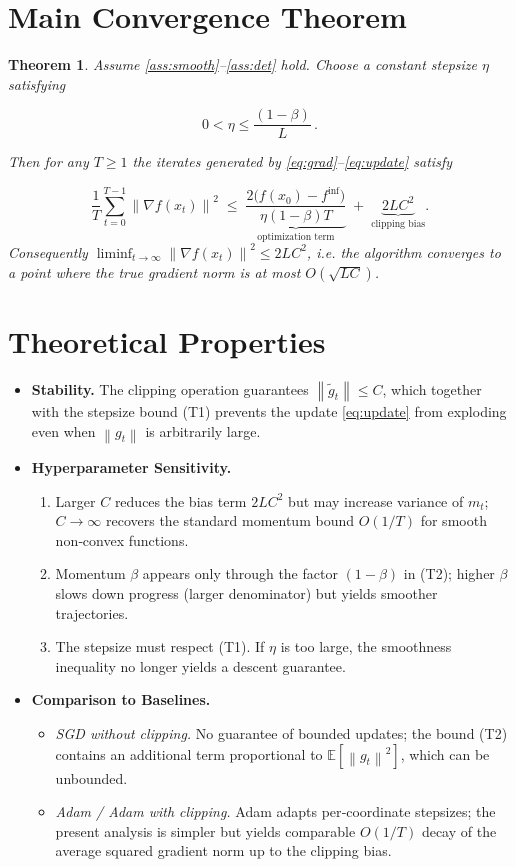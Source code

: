 \documentclass{article}
\newtheorem{theorem}{Theorem}
\newcommand{\E}{\mathbb{E}}
\newcommand{\norm}[1]{\left\lVert#1\right\rVert}
\newcommand{\grad}{\nabla}
\begin{document}
\section*{Main Convergence Theorem}
\begin{theorem}\label{thm:main}
Assume \ref{ass:smooth}–\ref{ass:det} hold. Choose a constant stepsize $\eta$ satisfying  

\[
0<\eta\le \frac{(1-\beta)}{L}\,. \tag{T1}
\]

Then for any $T\ge 1$ the iterates generated by \eqref{eq:grad}–\eqref{eq:update} satisfy  

\[
\frac{1}{T}\sum_{t=0}^{T-1}\norm{\grad f(x_t)}^2
\;\le\;
\underbrace{\frac{2\bigl(f(x_0)-f^{\inf}\bigr)}{\eta(1-\beta)T}}_{\displaystyle\text{optimization term}}
\;+\;
\underbrace{2L C^2}_{\displaystyle\text{clipping bias}} .
\tag{T2}
\]
Consequently $\displaystyle\liminf_{t\to\infty}\norm{\grad f(x_t)}^2\le 2LC^2$, i.e. the algorithm converges to a point where the true gradient norm is at most $O(\sqrt{LC})$.
\end{theorem}

\section*{Theoretical Properties}
\begin{itemize}[leftmargin=*]
    \item \textbf{Stability.} The clipping operation guarantees $\norm{\tilde g_t}\le C$, which together with the stepsize bound (T1) prevents the update \eqref{eq:update} from exploding even when $\norm{g_t}$ is arbitrarily large.
    \item \textbf{Hyperparameter Sensitivity.}
    \begin{enumerate}
        \item Larger $C$ reduces the bias term $2LC^2$ but may increase variance of $m_t$; $C\to\infty$ recovers the standard momentum bound $O(1/T)$ for smooth non‑convex functions.
        \item Momentum $\beta$ appears only through the factor $(1-\beta)$ in (T2); higher $\beta$ slows down progress (larger denominator) but yields smoother trajectories.
        \item The stepsize must respect (T1). If $\eta$ is too large, the smoothness inequality no longer yields a descent guarantee.
    \end{enumerate}
    \item \textbf{Comparison to Baselines.}
    \begin{itemize}
        \item \textit{SGD without clipping.}  No guarantee of bounded updates; the bound (T2) contains an additional term proportional to $\E[\norm{g_t}^2]$, which can be unbounded.
        \item \textit{Adam / Adam with clipping.}  Adam adapts per‑coordinate stepsizes; the present analysis is simpler but yields comparable $O(1/T)$ decay of the average squared gradient norm up to the clipping bias.
    \end{itemize}
\end{itemize}
\end{document}
